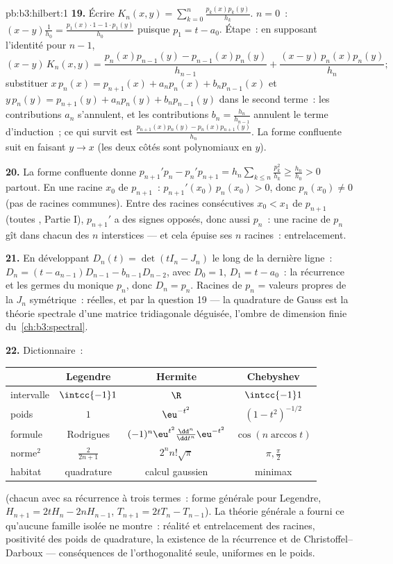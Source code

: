 \begin{solution}{pb:b3:hilbert:1}
\textbf{19.} Écrire $K_n(x, y) =
\sum_{k=0}^n\frac{p_k(x)p_k(y)}{h_k}$.  $n = 0$~: $(x -
y)\frac1{h_0} = \frac{p_1(x)\cdot1 - 1\cdot p_1(y)}{h_0}$
puisque $p_1 = t - a_0$. Étape~: en supposant l'identité pour
$n - 1$,
\[
(x - y)\,K_n(x,y) = \frac{p_n(x)p_{n-1}(y) -
p_{n-1}(x)p_n(y)}{h_{n-1}} +
\frac{(x - y)\,p_n(x)p_n(y)}{h_n} ;
\]
substituer $x\,p_n(x) = p_{n+1}(x) + a_np_n(x) +
b_np_{n-1}(x)$ et $y\,p_n(y) = p_{n+1}(y) + a_np_n(y) +
b_np_{n-1}(y)$ dans le second terme~: les contributions $a_n$
s'annulent, et les contributions $b_n = \frac{h_n}{h_{n-1}}$
annulent le terme d'induction~; ce qui survit est
$\frac{p_{n+1}(x)p_n(y) - p_n(x)p_{n+1}(y)}{h_n}$. La forme
confluente suit en faisant $y \to x$ (les deux côtés sont
polynomiaux en $y$).

\textbf{20.} La forme confluente donne $p_{n+1}'p_n -
p_n'p_{n+1} = h_n\sum_{k\leq n}\frac{p_k^2}{h_k} \geq
\frac{h_n}{h_0} > 0$ partout. En une racine $x_0$ de
$p_{n+1}$~: $p_{n+1}'(x_0)\,p_n(x_0) > 0$, donc $p_n(x_0)
\neq 0$ (pas de racines communes). Entre des racines
consécutives $x_0 < x_1$ de $p_{n+1}$ (toutes , Partie
I), $p_{n+1}'$ a des signes opposés, donc aussi $p_n$~: une
racine de $p_n$ gît dans chacun des $n$ interstices --- et
cela épuise ses $n$ racines~: entrelacement.

\textbf{21.} En développant $D_n(t) = \det(tI_n - J_n)$ le
long de la dernière ligne~: $D_n = (t - a_{n-1})D_{n-1} -
b_{n-1}D_{n-2}$, avec $D_0 = 1$, $D_1 = t - a_0$~: la
récurrence et les germes du monique $p_n$, donc $D_n = p_n$.
Racines de $p_n$ = valeurs propres de la $J_n$ symétrique~:
réelles, et  par la question 19 --- la quadrature de
Gauss est la théorie spectrale d'une matrice tridiagonale
déguisée, l'ombre de dimension finie du~\cref{ch:b3:spectral}.

\textbf{22.} Dictionnaire~:
\begin{center}
\begin{tabular}{l|c|c|c}
 & Legendre & Hermite & Chebyshev\\
\hline
intervalle & $\intcc{-1}1$ & $\R$ & $\intcc{-1}1$\\
poids & $1$ & $\eu^{-t^2}$ & $(1-t^2)^{-1/2}$\\
formule & Rodrigues & $(-1)^n\eu^{t^2}
\frac{\dd^n}{\dd t^n}\eu^{-t^2}$ & $\cos(n\arccos t)$\\
norme$^2$ & $\frac2{2n+1}$ & $2^nn!\sqrt\pi$ & $\pi,
\frac\pi2$\\
habitat & quadrature & calcul gaussien & minimax\\
\end{tabular}
\end{center}
(chacun avec sa récurrence à trois termes~: forme générale
pour Legendre, $H_{n+1} = 2tH_n - 2nH_{n-1}$, $T_{n+1} =
2tT_n - T_{n-1}$). La théorie générale a fourni ce qu'aucune
famille isolée ne montre~: réalité et entrelacement des
racines, positivité des poids de quadrature, la 
existence de la récurrence et de Christoffel--Darboux ---
conséquences de l'orthogonalité seule, uniformes en le
poids.


\end{solution}
